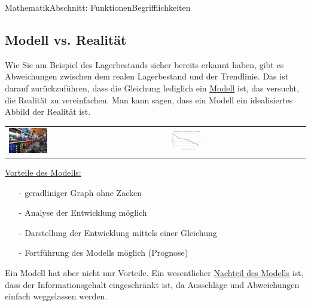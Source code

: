\documentclass[11pt,twocolumn,oneside,openany,headings=optiontotoc,11pt,numbers=noenddot]{article}
\begin{document}
\begin{worksheet}{Mathematik}{Abschnitt: Funktionen}{Begrifflichkeiten}
		\subsection{Modell vs. Realität}
		Wie Sie am Beispiel des Lagerbestands sicher bereits erkannt haben, gibt es Abweichungen zwischen dem realen Lagerbestand und der Trendlinie. Das ist darauf zurückzuführen, dass die Gleichung lediglich ein \underline{Modell} ist, das versucht, die Realität zu vereinfachen. Man kann sagen, dass ein Modell ein idealisiertes Abbild der Realität ist.\\
		\par\bigskip\noindent
		\begin{tabularx}{0.45\textwidth}{XX}
			\includegraphics[width=0.25\textwidth]{../99_Bilder/lager.jpg} & \includegraphics[width=0.25\textwidth]{../99_Bilder/bier2.jpg}
		\end{tabularx}
		\par\bigskip\noindent
		\underline{Vorteile des Modells:}
		\begin{itemize}
			\item[-] geradliniger Graph ohne Zacken
			\item[-] Analyse der Entwicklung möglich
			\item[-] Darstellung der Entwicklung mittels einer Gleichung
			\item[-] Fortführung des Modells möglich (Prognose)
		\end{itemize}
		Ein Modell hat aber nicht nur Vorteile. Ein wesentlicher \underline{Nachteil des Modells} ist, dass der Informationsgehalt eingeschränkt ist, da Ausschläge und Abweichungen einfach weggelassen werden.
		\newpage

\end{worksheet}
\end{document}
